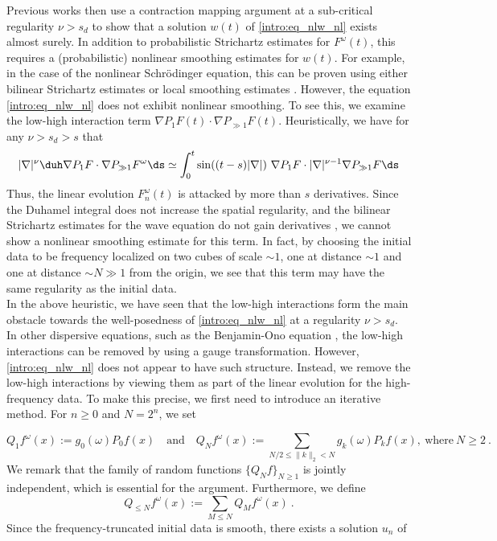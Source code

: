 \documentclass[11pt]{article}
\begin{document}
Previous works \cite{BOP15,BOP17,DLM17,OP16,Pocovnicu17} then use a contraction mapping argument at a sub-critical regularity \( \nu > s_d \) to show that a solution \( w(t) \) of  \eqref{intro:eq_nlw_nl} exists almost surely. In addition to probabilistic Strichartz estimates for \( F^\omega(t) \), this requires a (probabilistic) nonlinear smoothing estimates for \( w(t) \). For example, in the case of the nonlinear Schrödinger equation, this can be proven using either bilinear Strichartz estimates \cite{BOP15,BOP17,Brereton16} or local smoothing estimates \cite{DLM18}. However, the equation \eqref{intro:eq_nlw_nl} does not exhibit nonlinear smoothing. To see this, we examine the low-high interaction term \( \nabla P_1 F(t) \cdot \nabla P_{\gg 1} F(t) \). Heuristically, we have for any \( \nu >s_d>s \) that 
\begin{equation*}
|\nabla|^{\nu} \duh \nabla P_1 F \cdot \nabla P_{\gg 1} F^\omega \ds \simeq \int_0^t \sin((t-s)|\nabla|)~ \nabla P_1 F \cdot |\nabla|^{\nu-1} \nabla P_{\gg 1} F \ds 
\end{equation*}
Thus, the linear evolution \( F_n^\omega(t) \) is attacked by more than \( s \) derivatives. Since the Duhamel integral does not increase the spatial regularity, and the bilinear Strichartz estimates for the wave equation do not gain derivatives \cite{FK00}, we cannot show a nonlinear smoothing estimate for this term. In fact, by choosing the initial data to be frequency localized on two cubes of scale \( \sim 1\), one at distance \( \sim 1 \) and one at distance \( \sim N \gg 1 \) from the origin, we see that this term may have the same regularity as the initial data. \\
In the above heuristic, we have seen that the low-high interactions form the main obstacle towards the well-posedness of \eqref{intro:eq_nlw_nl} at a regularity \( \nu> s_d \). In other dispersive equations, such as the Benjamin-Ono equation \cite{Tao04}, the low-high interactions can be removed by using a gauge transformation. However, \eqref{intro:eq_nlw_nl} does not appear to have such structure. Instead, we remove the low-high interactions by viewing them as part of the linear evolution for the high-frequency data. To make this precise, we first need to introduce an iterative method. For \( n\geq 0 \) and \( N= 2^n \), we set 

\begin{equation*}
 Q_1 f^\omega(x):= g_0(\omega) P_0 f(x)\quad \text{and} \quad Q_{N} f^\omega(x) := \sum_{N/2\leq \| k \|_2 < N} g_k(\omega) P_k f (x), ~\text{where}~  N \geq 2~.
 \end{equation*}
 We remark that the family of random functions \( \{ Q_N f \}_{N\geq 1} \) is jointly independent, which is essential for the argument. Furthermore, we define
 \begin{equation*}
 Q_{\leq N}f^\omega(x):= \sum_{M\leq N} Q_{M}f^\omega(x)~.
 \end{equation*}
 Since the frequency-truncated initial data is smooth, there exists a solution \( u_n \) of 
\end{document}
